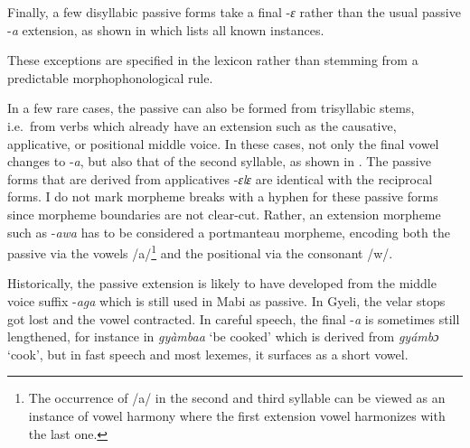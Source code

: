 Finally, a few disyllabic passive forms take a final -{\itshape ɛ} rather than the usual passive -{\itshape a} extension, as shown in  which lists all known instances.


\noindent These exceptions are specified in the lexicon rather than stemming from a predictable morphophonological rule.


In a few rare cases, the passive can also be formed from trisyllabic stems, i.e.\ from verbs which already have an extension such as the causative, applicative, or positional middle voice. In these cases, not only the final vowel changes to -{\itshape a}, but also that of the second syllable, as shown in . The passive forms that are derived from applicatives -{\itshape ɛlɛ} are identical with the reciprocal forms. I do not mark morpheme breaks with a hyphen for these passive forms since morpheme boundaries are not clear-cut. Rather, an extension morpheme such as -{\itshape awa} has to be considered a portmanteau morpheme, encoding both the passive via the vowels /a/\footnote{The occurrence of /a/ in the second and third syllable can be viewed as an instance of vowel harmony where the first extension vowel harmonizes with the last one.} and the positional via the consonant /w/.


Historically, the passive extension is likely to have developed from the middle voice suffix -{\itshape aga} which is still used in Mabi as passive. In Gyeli, the velar stops got lost and the vowel contracted. In careful speech, the final -{\itshape a} is sometimes still lengthened, for instance in {\itshape gyàmbaa} `be cooked' which is derived from {\itshape gyámbɔ} `cook',  but in fast speech and most lexemes, it surfaces as a short vowel.

